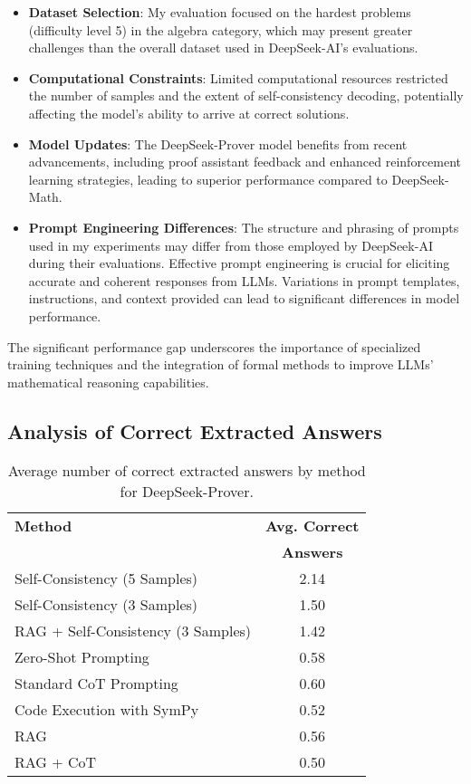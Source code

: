 \documentclass[11pt,a4paper]{article}
\begin{document}
\begin{itemize}
    \item \textbf{Dataset Selection}: My evaluation focused on the hardest problems (difficulty level 5) in the algebra category, which may present greater challenges than the overall dataset used in DeepSeek-AI's evaluations.
    \item \textbf{Computational Constraints}: Limited computational resources restricted the number of samples and the extent of self-consistency decoding, potentially affecting the model's ability to arrive at correct solutions.
    \item \textbf{Model Updates}: The DeepSeek-Prover model benefits from recent advancements, including proof assistant feedback and enhanced reinforcement learning strategies, leading to superior performance compared to DeepSeek-Math.
    \item \textbf{Prompt Engineering Differences}: The structure and phrasing of prompts used in my experiments may differ from those employed by DeepSeek-AI during their evaluations. Effective prompt engineering is crucial for eliciting accurate and coherent responses from LLMs. Variations in prompt templates, instructions, and context provided can lead to significant differences in model performance.
\end{itemize}

The significant performance gap underscores the importance of specialized training techniques and the integration of formal methods to improve LLMs' mathematical reasoning capabilities.

\subsection{Analysis of Correct Extracted Answers}
\begin{table}[H]
\centering
\footnotesize
\begin{tabular}{lc}
\toprule
\textbf{Method} & \textbf{Avg. Correct} \\ 
                & \textbf{Answers} \\
\midrule
Self-Consistency (5 Samples) & 2.14 \\
Self-Consistency (3 Samples) & 1.50 \\
RAG + Self-Consistency (3 Samples) & 1.42 \\
Zero-Shot Prompting & 0.58 \\
Standard CoT Prompting & 0.60 \\
Code Execution with SymPy & 0.52 \\
RAG & 0.56 \\
RAG + CoT & 0.50 \\
\bottomrule
\end{tabular}
\caption{Average number of correct extracted answers by method for DeepSeek-Prover.}
\label{tab:correct_extracted}
\end{table}
\end{document}
